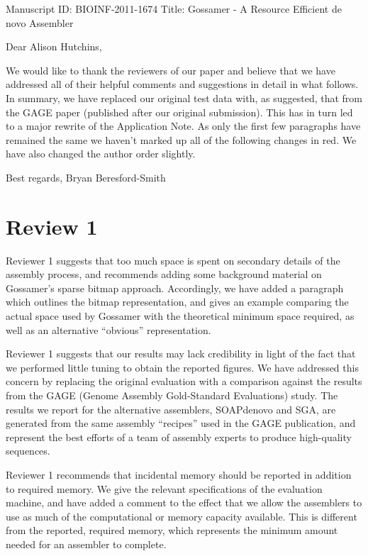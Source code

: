 \documentclass{article}
\begin{document}
\noindent Manuscript ID: BIOINF-2011-1674 \newline
Title: Gossamer - A Resource Efficient de novo Assembler
\newline
\newline

\noindent Dear Alison Hutchins,

We would like to thank the reviewers of our paper and believe that we have addressed all
of their helpful comments and suggestions in detail in what follows.
In summary, we have replaced our original test data with, as suggested, that from the GAGE paper 
(published after our original submission). This has in turn led to a major rewrite of the Application Note.
As only the first few paragraphs have remained the same we haven't marked up all of the following changes in red.
We have also changed the author order slightly.

\noindent Best regards, \newline
\noindent Bryan Beresford-Smith 

\section*{Review 1}

Reviewer 1 suggests that too much space is spent on secondary details of the assembly process, and recommends adding some background material on Gossamer's sparse bitmap approach. Accordingly, we have added a paragraph which outlines the bitmap representation, and gives an example comparing the actual space used by Gossamer with the theoretical minimum space required, as well as an alternative ``obvious'' representation.

Reviewer 1 suggests that our results may lack credibility in light of the fact that we performed little tuning to obtain the reported figures. We have addressed this concern by replacing the original evaluation with a comparison against the results from the GAGE (Genome Assembly Gold-Standard Evaluations) study. The results we report for the alternative assemblers, SOAPdenovo and SGA, are generated from the same assembly ``recipes'' used in the GAGE publication, and represent the best efforts of a team of assembly experts to produce high-quality sequences.

Reviewer 1 recommends that incidental memory should be reported in addition to required memory. We give the relevant specifications of the evaluation machine, and have added a comment to the effect that we allow the assemblers to use as much of the computational or memory capacity available. This is different from the reported, required memory, which represents the minimum amount needed for an assembler to complete.
\end{document}
